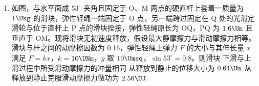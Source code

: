 \documentclass[\gkver]{gaokaozhenti}
\begin{document}
\begin{enumerate}
{B．根据相邻干涉条纹间距公式 $\Delta x = \frac{L}{d}\lambda$，由于蓝光的波长较短，故蓝光相邻条纹间距比红光相邻条纹间距小，故 B 正确；

CD．蓝光的相邻干涉条纹间距为 $\Delta x_{1} = 4.4 \times 10^{-4} \Um$

红光的相邻干涉条纹间距为 $\Delta x_{2} = 6.6 \times 10^{-4} \Um$

要使蓝光和红光亮条纹中心重叠，可知 $m\Delta x_{1} = n\Delta x_{2}$，$m = 0,1,2\cdots$，$n = 0,1,2\cdots$

可知当 $m\Delta x_{1} = n\Delta x_{2} = 1.32 \Umm$ 时，满足条件；当 $m\Delta x_{1} = n\Delta x_{2} = 1.98 \Umm$ 时，不满足条件；

故 C 正确，D 错误。

故选 BC。
}

\item
如图，与水平面成 $53^\circ$ 夹角且固定于 O、M 两点的硬直杆上套着一质量为 $1 \Ukg$ 的滑块，弹性轻绳一端固定于 O 点，另一端跨过固定在 Q 处的光滑定滑轮与位于直杆上 P 点的滑块拴接，弹性轻绳原长为 OQ，PQ 为 $1.6 \Um$ 且垂直于 OM。现将滑块无初速度释放，假设最大静摩擦力与滑动摩擦力相等。滑块与杆之间的动摩擦因数为 0.16，弹性轻绳上弹力 $F$ 的大小与其伸长量 $x$ 满足 $F = kx$，$k = 10 \UNm$，$g$ 取 $10 \Umsq$，$\sin 53^\circ = 0.8$。则滑块
{下滑与上滑过程中所受滑动摩擦力的冲量相同}
{从释放到静止的位移大小为 $0.64 \Um$}
{从释放到静止克服滑动摩擦力做功为 $2.56 \UJ$}
\end{enumerate}
\end{document}
